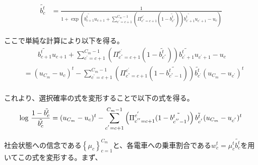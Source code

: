 \documentclass{jsarticle}
\begin{document}
\begin{align*}
	\tilde{b_c^t} &= \frac{1}{1 + \exp \left(\tilde{b_{c+1}^t} u_{c+1} + \sum_{c^{'}=c+1}^{C_m-1} \left( \Pi_{c^{''} = c+1}^{c^{'}} (1 - \tilde{b_{c^{''}}^t}) \right) \tilde{b_{c^{'} + 1}^t} u_{c^{'} + 1} - u_c \right)}
\end{align*}

ここで単純な計算により以下を得る。
\begin{align*}
	&\qquad \tilde{b_{c+1}^t} u_{c+1} + \sum_{c^{'}=c+1}^{C_m-1} \left( \Pi_{c^{''} = c+1}^{c^{'}} (1 - \tilde{b_{c^{''}}^t}) \right) \tilde{b_{c^{'} + 1}^t} u_{c^{'} + 1} - u_c\\[8pt]
	&= (u_{C_m} - u_c)^t - \sum_{c^{'} = c+1}^{C_m - 1} \left( \Pi_{c^{''} = c+1}^{c^{'}} (1 - \tilde{b_{c^{''} - 1}^t}) \right) \tilde{b_{c^{'}}^t} (u_{C_m} - u_{c^{'}})^t\\[8pt]
\end{align*}

これより、選択確率の式を変形することで以下の式を得る。
\begin{align}
	{\rm log}\ \frac{1 - \tilde{{b_c^t}}}{\tilde{b_c^t}} = (u_{C_m} - u_c)^t - \sum_{c^{'} = c+1}^{C_m - 1} \left( \Pi_{c^{''} = c+1}^{c^{'}} (1 - \tilde{b_{c^{''} - 1}^t}) \right) \tilde{b_{c^{'}}^t} (u_{C_m} - u_{c^{'}})^t
\end{align}

社会状態への信念である$\left\{ \mu_c \right\}_{c = 1}^{C_m}$と、各電車への乗車割合である$w_c^t = \mu_c^t \tilde{b_c^t}$を用いてこの式を変形する。まず、
\end{document}
